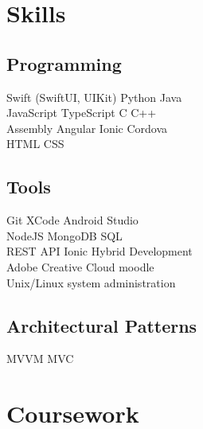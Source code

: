 \documentclass[]{deedy-resume-openfont}
\begin{document}
\begin{minipage}[t]{0.33\textwidth}
\sectionsep


\section{Skills}
\subsection{Programming}
\textbullet{} Swift (SwiftUI, UIKit) \textbullet{} Python \textbullet{} Java \\
\textbullet{} JavaScript \textbullet{} TypeScript \textbullet{} C \textbullet{} C++ \\
\textbullet{} Assembly \textbullet{} Angular \textbullet{} Ionic \textbullet{} Cordova \\
\textbullet{} HTML \textbullet{} CSS \\
\sectionsep

\subsection{Tools}
\textbullet{} Git \textbullet{} XCode \textbullet{} Android Studio \\
\textbullet{} NodeJS \textbullet{} MongoDB \textbullet{} SQL \\
\textbullet{} REST API \textbullet{} Ionic Hybrid Development \\
\textbullet{} Adobe Creative Cloud \textbullet{} moodle \\
\textbullet{}  Unix/Linux system administration \\
\sectionsep

\subsection{Architectural Patterns}
\textbullet{} MVVM  \textbullet{} MVC \\
\sectionsep


\section{Coursework}

\end{minipage}
\end{document}
